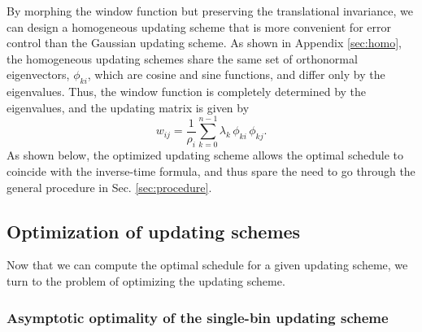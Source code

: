 \documentclass[preprint, superscriptaddress, floatfix]{revtex4-1}
\begin{document}
By morphing the window function
but preserving the translational invariance,
we can design a homogeneous updating scheme
that is more convenient for error control
than the Gaussian updating scheme.
%
%
As shown in Appendix \ref{sec:homo},
the homogeneous updating schemes share
the same set of orthonormal eigenvectors, $\phi_{ki}$,
which are cosine and sine functions,
and differ only by the eigenvalues.
%
Thus, the window function is completely determined
by the eigenvalues, and the updating matrix
is given by\cite{bussi2006}
%
\begin{equation}
  w_{ij}
  =
  \frac{1}{\rho_i} \sum_{k=0}^{n - 1}
  \lambda_k \, \phi_{ki} \, \phi_{kj}
  .
  \label{eq:w_from_phi}
\end{equation}
%
As shown below,
the optimized updating scheme
allows the optimal schedule to coincide with
the inverse-time formula,
and thus spare the need to
go through the general procedure in Sec. \ref{sec:procedure}.




\subsection{\label{sec:cmpschemes}
Optimization of updating schemes}


Now that we can compute the optimal schedule
for a given updating scheme,
we turn to the problem of optimizing
the updating scheme.


\subsubsection{\label{sec:optWL}
Asymptotic optimality of the single-bin updating scheme}
\end{document}
